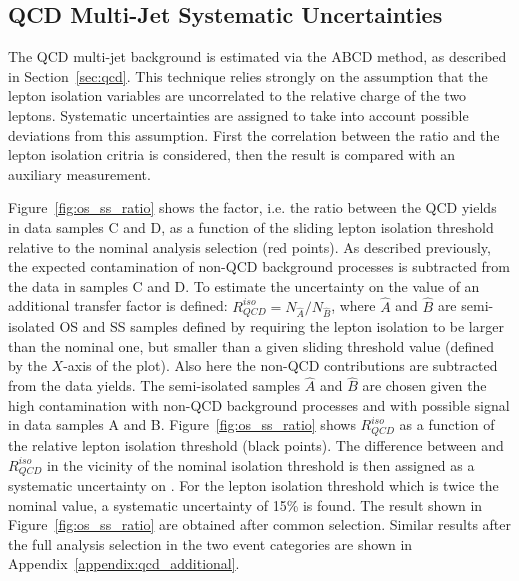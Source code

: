 \subsection{QCD Multi-Jet Systematic Uncertainties}\label{sec:qcdsys}

The QCD multi-jet background is estimated via the ABCD method, as
described in Section~\ref{sec:qcd}. This technique relies strongly on
the assumption that the lepton isolation variables are uncorrelated to the relative
charge of the two leptons. Systematic uncertainties
are assigned to take into account possible deviations from this assumption.
First the correlation between the ratio  \rqcd and the lepton isolation critria is considered,
then the result is compared with an auxiliary measurement. 

Figure~\ref{fig:os_ss_ratio} shows the \rqcd factor, i.e. the ratio between the QCD 
yields in data samples C and D, as a function of the sliding lepton isolation threshold relative to the 
nominal analysis selection (red points).
As described previously, the expected contamination of  non-QCD background processes is subtracted from the data in samples C and D.
To estimate the uncertainty on the value of \rqcd  an additional transfer factor is defined: $R_{QCD}^{iso}  = N_{\hat{A}} / N_{\hat{B}}$,
where  $\hat{A}$ and $\hat{B}$  are semi-isolated OS and SS samples defined by requiring the lepton isolation to be  larger 
than the nominal one, 
but smaller than a given sliding threshold value (defined by the $X$-axis of the plot). Also here the non-QCD contributions are subtracted from the data yields.
The semi-isolated samples $\hat{A}$ and $\hat{B}$ are chosen  
given the high contamination with non-QCD background processes and with possible signal in data samples A and B. 
Figure~\ref{fig:os_ss_ratio} shows $R_{QCD}^{iso}$ as a function of the relative lepton isolation threshold (black points).
The difference between \rqcd and $R_{QCD}^{iso} $ in the vicinity of the nominal isolation threshold
is then assigned as a systematic uncertainty on \rqcd. For the lepton isolation threshold which is 
twice the nominal value, a systematic uncertainty of 15\% is found.
The result shown  in Figure~\ref{fig:os_ss_ratio} are obtained  after common selection. Similar results after the full analysis selection
in the two event categories are shown in Appendix~\ref{appendix:qcd_additional}.

